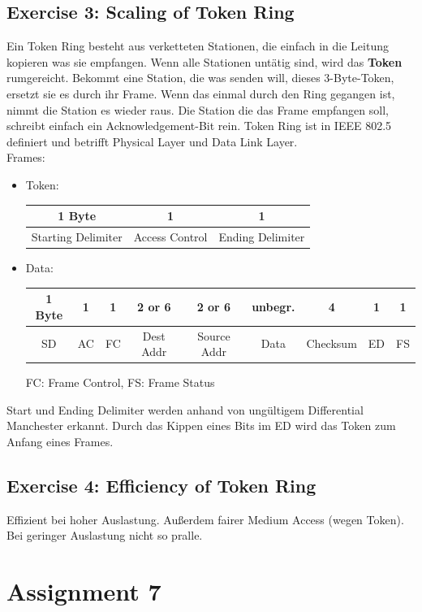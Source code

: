 \documentclass[10pt,a4paper]{scrartcl}
\begin{document}
\subsection*{Exercise 3: Scaling of Token Ring}
Ein Token Ring besteht aus verketteten Stationen, die einfach in die Leitung kopieren was sie empfangen. Wenn alle Stationen untätig sind, wird das \textbf{Token} rumgereicht. Bekommt eine Station, die was senden will, dieses 3-Byte-Token, ersetzt sie es durch ihr Frame. Wenn das einmal durch den Ring gegangen ist, nimmt die Station es wieder raus. Die Station die das Frame empfangen soll, schreibt einfach ein Acknowledgement-Bit rein. Token Ring ist in IEEE 802.5 definiert und betrifft Physical Layer und Data Link Layer. \\

Frames: 
\begin{itemize}
\item Token: 
\begin{tabular}{|c|c|c|}
1 Byte & 1 & 1\\
\hline Starting Delimiter & Access Control & Ending Delimiter \\ 
\hline 
\end{tabular} 
\item Data:
\begin{tabular}{|c|c|c|c|c|c|c|c|c|}
 1 Byte & 1 & 1 & 2 or 6 & 2 or 6 & unbegr. & 4 & 1 & 1 \\ 
\hline SD & AC & FC & Dest Addr & Source Addr & Data & Checksum & ED & FS \\ 
\hline 
\end{tabular} 
FC: Frame Control, FS: Frame Status
\end{itemize}
Start und Ending Delimiter werden anhand von ungültigem Differential Manchester erkannt. Durch das Kippen eines Bits im ED wird das Token zum Anfang eines Frames.

\subsection*{Exercise 4: Efficiency of Token Ring}
Effizient bei hoher Auslastung. Außerdem fairer Medium Access (wegen Token). Bei geringer Auslastung nicht so pralle. 

\section*{Assignment 7}
\end{document}
